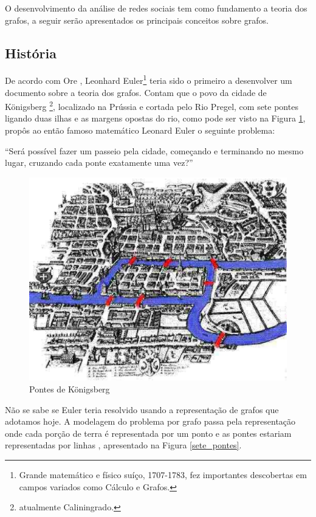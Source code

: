 O desenvolvimento da análise de redes sociais tem como fundamento a teoria dos grafos, a seguir serão apresentados os principais conceitos sobre grafos.

\subsection{História}

De acordo com Ore \cite{Ore:1963}, Leonhard Euler\footnote{Grande matemático e físico suíço, 1707-1783, fez importantes descobertas em campos variados como Cálculo e Grafos.} teria sido o primeiro a desenvolver um documento sobre a teoria dos grafos. Contam que o povo da cidade de Königsberg \footnote{atualmente Caliningrado.}, localizado na Prússia e cortada pelo Rio Pregel, com sete pontes ligando duas ilhas e as margens opostas do rio, como pode ser visto na Figura \ref{Konigsberg}, propôs ao então famoso matemático Leonard Euler o seguinte problema:

	“Será possível fazer um passeio pela cidade, começando e
	terminando no mesmo lugar, cruzando cada ponte exatamente uma vez?”

\begin{figure}[!h]
	\centering
	\includegraphics[scale=0.5]{figuras/capitulo1/Konigsberg.eps}
	\caption{Pontes de Königsberg}
	\label{Konigsberg}
\end{figure}

Não se sabe se Euler teria resolvido usando a representação de grafos que adotamos hoje. A modelagem do problema por grafo passa pela representação onde cada porção de terra  é representada por um ponto e as pontes estariam representadas por linhas \cite{Ore:1963}, apresentado na Figura \ref{sete_pontes}.

